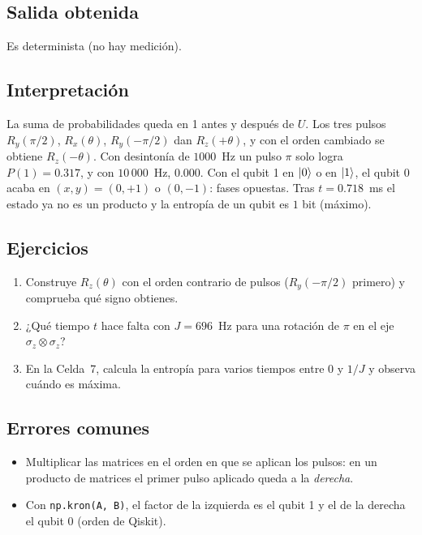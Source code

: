 \subsection{Salida obtenida}

Es determinista (no hay medición).

\subsection{Interpretación}
La suma de probabilidades queda en 1 antes y después de $U$. Los tres pulsos
$R_y(\pi/2)$, $R_x(\theta)$, $R_y(-\pi/2)$ dan $R_z(+\theta)$, y con el orden
cambiado se obtiene $R_z(-\theta)$. Con desintonía de $1000$~Hz un pulso $\pi$
solo logra $P(1)=0.317$, y con $10\,000$~Hz, $0.000$. Con el qubit 1 en
$\left|0\right\rangle$ o en $\left|1\right\rangle$, el qubit 0 acaba en $(x,y)=(0,+1)$ o $(0,-1)$: fases
opuestas. Tras $t=0.718$~ms el estado ya no es un producto y la entropía de un
qubit es $1$ bit (máximo).

\subsection{Ejercicios}
\begin{enumerate}
  \item Construye $R_z(\theta)$ con el orden contrario de pulsos
    ($R_y(-\pi/2)$ primero) y comprueba qué signo obtienes.
  \item ¿Qué tiempo $t$ hace falta con $J=696$~Hz para una rotación de
    $\pi$ en el eje $\sigma_z\otimes\sigma_z$?
  \item En la Celda~7, calcula la entropía para varios tiempos entre $0$ y
    $1/J$ y observa cuándo es máxima.
\end{enumerate}

\subsection{Errores comunes}
\begin{itemize}
  \item Multiplicar las matrices en el orden en que se aplican los pulsos:
    en un producto de matrices el primer pulso aplicado queda a la
    \emph{derecha}.
  \item Con \texttt{np.kron(A, B)}, el factor de la izquierda es el qubit 1 y el
    de la derecha el qubit 0 (orden de Qiskit).
\end{itemize}


